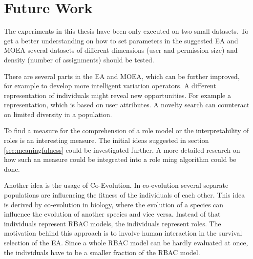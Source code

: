 \newpage
\chapter{Future Work}
\label{sec:futureWork}
The experiments in this thesis have been only executed on two small datasets. To get a better understanding on how to set parameters in the suggested EA and MOEA several datasets of different dimensions (user and permission size) and density (number of assignments) should be tested.

There are several parts in the EA and MOEA, which can be further improved, for example to develop more intelligent variation operators. A different representation of individuals might reveal new opportunities. For example a representation, which is based on user attributes. A novelty search can counteract on limited diversity in a population.

To find a measure for the comprehension of a role model or the interpretability of roles is an interesting measure. The initial ideas suggested in section \ref{sec:meaningfulness} could be investigated further. A more detailed research on how such an measure could be integrated into a role ming algorithm could be done.

Another idea is the usage of Co-Evolution. In co-evolution several separate populations are influencing the fitness of the individuals of each other. This idea is derived by co-evolution in biology, where the evolution of a species can influence the evolution of another species and vice versa. Instead of that individuals represent RBAC models, the individuals represent roles. The motivation behind this approach is to involve human interaction in the survival selection of the EA. Since a whole RBAC model can be hardly evaluated at once, the individuals have to be a smaller fraction of the RBAC model.

    
